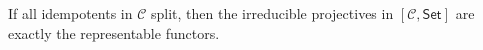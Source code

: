 If all idempotents in $\mathcal{C}$ split, then the irreducible projectives
in $[\mathcal{C}, \mathsf{Set}]$ are exactly the representable functors.
